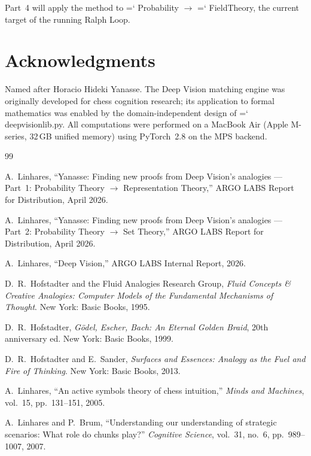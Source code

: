 \documentclass[11pt]{article}
\renewcommand{\texttt}[1]{%
  \begingroup\ttfamily\hyphenchar\font=`\-\relax
  \def\_{\textunderscore\discretionary{}{}{}}%
  #1\endgroup}
\theoremstyle{definition}
\theoremstyle{remark}
\begin{document}
Part~4 will apply the method to \texttt{Probability} $\to$
\texttt{FieldTheory}, the current target of the running Ralph Loop.

\section*{Acknowledgments}

Named after Horacio Hideki Yanasse.  The Deep Vision matching engine
was originally developed for chess cognition research; its application
to formal mathematics was enabled by the domain-independent design of
\texttt{deep\_vision\_lib.py}.  All computations were performed on a
MacBook Air (Apple M-series, 32\,GB unified memory) using PyTorch~2.8
on the MPS backend.

\begin{thebibliography}{99}

A.~Linhares,
``Yanasse: Finding new proofs from Deep Vision's analogies --- Part~1:
Probability Theory $\to$ Representation Theory,''
ARGO LABS Report for Distribution, April 2026.

A.~Linhares,
``Yanasse: Finding new proofs from Deep Vision's analogies --- Part~2:
Probability Theory $\to$ Set Theory,''
ARGO LABS Report for Distribution, April 2026.

A.~Linhares,
``Deep Vision,''
ARGO LABS Internal Report, 2026.

D.~R.~Hofstadter and the Fluid Analogies Research Group, \emph{Fluid Concepts \& Creative Analogies: Computer Models of the Fundamental Mechanisms of Thought}. New York: Basic Books, 1995.

D.~R.~Hofstadter, \emph{G\"odel, Escher, Bach: An Eternal Golden Braid}, 20th anniversary ed. New York: Basic Books, 1999.

D.~R.~Hofstadter and E.~Sander, \emph{Surfaces and Essences: Analogy as the Fuel and Fire of Thinking}. New York: Basic Books, 2013.

A.~Linhares, ``An active symbols theory of chess intuition,'' \emph{Minds and Machines}, vol.~15, pp.~131--151, 2005.

A.~Linhares and P.~Brum, ``Understanding our understanding of strategic scenarios: What role do chunks play?'' \emph{Cognitive Science}, vol.~31, no.~6, pp.~989--1007, 2007.


\end{thebibliography}
\end{document}

